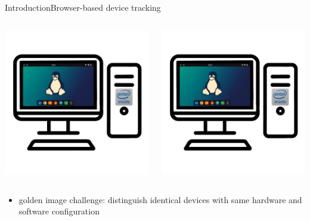 \documentclass[aspectratio=169, hyperref={colorlinks=true, allcolors=SecondaryColor}, c]{beamer}
\begin{document}
\begin{frame}[fragile]{Introduction}{Browser-based device tracking}
\begin{columns}
\begin{column}{0.33\textwidth}
			\includegraphics[width=1\textwidth]{./figures/computer_alpha_screen_2_golden.png}
		\end{column}
		\begin{column}{0.33\textwidth}
			\includegraphics[width=1\textwidth]{./figures/computer_alpha_screen_2_golden.png}
		\end{column}
	\end{columns}
	\vspace{-0.5cm}
	\begin{itemize}
		\item \alert{golden image challenge:} distinguish identical devices with same hardware and software configuration \checkboxUnchecked
	\end{itemize}
\end{frame}
\end{document}

